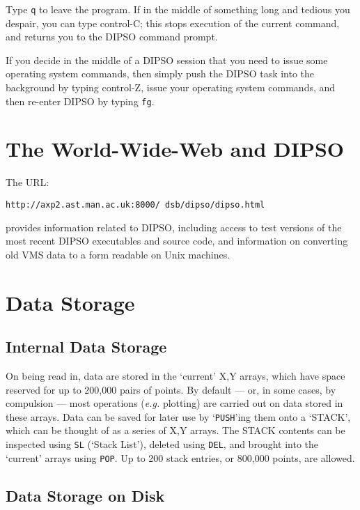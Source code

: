 \documentclass[twoside,11pt]{article}
\newcommand{\htmladdnormallink}[2]{#1}
\newcommand{\htmlref}[2]{#1}
\renewcommand{\_}{\texttt{\symbol{95}}}
\begin{document}
Type {\tt{q}}  to leave the program. If in the middle of something long and
tedious you despair, you can type control-C; this stops execution of the current
command, and returns you to the DIPSO command prompt.

If you decide in the middle of a DIPSO session that you need to issue some
operating system commands, then simply push the DIPSO task into the background
by typing control-Z,
issue your operating system commands, and then re-enter DIPSO by typing {\tt{fg}}. 

\section{The World-Wide-Web and DIPSO}
The URL:

\htmladdnormallink{{\tt{http://axp2.ast.man.ac.uk:8000/~dsb/dipso/dipso.html}}}{http://axp2.ast.man.ac.uk:8000/\~{}dsb/dipso/dipso.html}

provides information related to DIPSO, including access to test
versions of the most recent DIPSO executables and source code, and
information on converting old VMS data to a form readable on Unix machines.

\section {Data Storage}

\subsection{Internal Data Storage}

On being read in, data are stored in the `current' X,Y arrays, which have
space reserved for up to 200,000 pairs of points. By default --- or, in
some cases, by compulsion --- most operations ({\em e.g.} plotting) are
carried out on data stored in these arrays. Data can be saved for later
use by `\htmlref{{\tt{PUSH}}}{COM:PUSH}'ing  them onto a `STACK', which can
be thought of as a series of X,Y arrays. The STACK contents can be
inspected using \htmlref{{\tt{SL}}}{COM:SL}  (`Stack List'), deleted using
\htmlref{{\tt{DEL}}}{COM:DEL},  and brought into the `current' arrays using
\htmlref{{\tt{POP}}}{COM:POP}.  Up to 200 stack entries, or 800,000 points,
are allowed.

\subsection{Data Storage on Disk}
\end{document}
